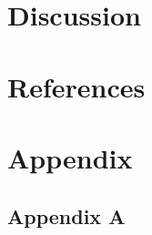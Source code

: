 \documentclass[
]{article}
\begin{document}
\newpage

\hypertarget{discussion}{%
\section{Discussion}\label{discussion}}

\newpage

\hypertarget{references}{%
\section{References}\label{references}}

\newpage

\hypertarget{appendix}{%
\section{Appendix}\label{appendix}}

\hypertarget{appendix-a}{%
\subsection{Appendix A}\label{appendix-a}}
\end{document}
